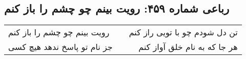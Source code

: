 \begin{center}
\section*{رباعی شماره ۴۵۹: رویت بینم چو چشم را باز کنم}
\label{sec:sh459}
\begin{longtable}{l p{0.5cm} r}
رویت بینم چو چشم را باز کنم
&&
تن دل شودم چو با تویی راز کنم
\\
جز نام تو پاسخ ندهد هیچ کسی
&&
هر جا که به نام خلق آواز کنم
\\
\end{longtable}
\end{center}
